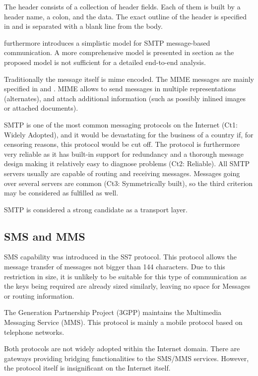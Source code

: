 The header consists of a collection of header fields. Each of them is built by a header name, a colon, and the data. The exact outline of the header is specified in \cite{RFC5322} and is separated with a blank line from the body. 

\cite{RFC5321} furthermore introduces a simplistic model for SMTP message-based communication. A more comprehensive model is presented in section  as the proposed model is not sufficient for a detailed end-to-end analysis.

Traditionally the message itself is mime encoded. The MIME messages are mainly specified in \cite{RFC2045} and \cite{RFC2046}. MIME allows to send messages in multiple representations (alternates), and attach additional information (such as possibly inlined images or attached documents). 

SMTP is one of the most common messaging protocols on the Internet (Ct1: Widely Adopted), and it would be devastating for the business of a country if, for censoring reasons, this protocol would be cut off. The protocol is furthermore very reliable as it has built-in support for redundancy and a thorough message design making it relatively easy to diagnose problems (Ct2: Reliable). All SMTP servers usually are capable of routing and receiving messages. Messages going over several servers are common (Ct3: Symmetrically built), so the third criterion may be considered as fulfilled as well.

SMTP is considered a strong candidate as a transport layer.  

\subsection{SMS and MMS}
SMS capability was introduced in the SS7 protocol. This protocol allows the message transfer of messages not bigger than 144 characters. Due to this restriction in size, it is unlikely to be suitable for this type of communication as the keys being required are already sized similarly, leaving no space for Messages or routing information.

The  Generation Partnership Project (3GPP) maintains the Multimedia Messaging Service (MMS). This protocol is mainly a mobile protocol based on telephone networks.

Both protocols are not widely adopted within the Internet domain. There are gateways providing bridging functionalities to the SMS/MMS services. However, the protocol itself is insignificant on the Internet itself. 

